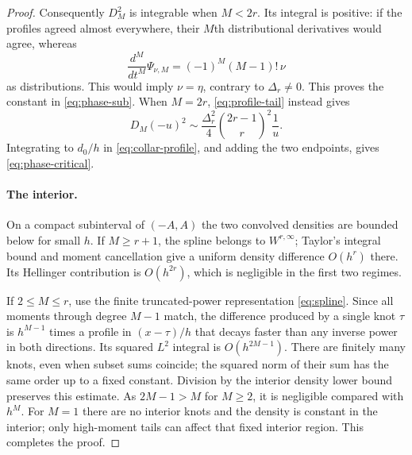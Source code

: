 \documentclass[11pt,a4paper]{article}
\numberwithin{equation}{section}
\theoremstyle{definition}
\theoremstyle{remark}
\begin{document}
\begin{proof}
Consequently $D_M^2$ is integrable when $M<2r$. Its integral is positive:
if the profiles agreed almost everywhere, their $M$th distributional
derivatives would agree, whereas
\[
 \frac{d^M}{dt^M}\Psi_{\nu,M}
 =(-1)^M(M-1)!\,\nu
\]
as distributions. This would imply $\nu=\eta$, contrary to
$\Delta_r\ne0$. This proves the constant in \eqref{eq:phase-sub}.
When $M=2r$, \eqref{eq:profile-tail} instead gives
\[
 D_M(-u)^2\sim\frac{\Delta_r^2}{4}
 \binom{2r-1}{r}^{\!2}\frac1u.
\]
Integrating to $d_0/h$ in \eqref{eq:collar-profile}, and adding the two
endpoints, gives \eqref{eq:phase-critical}.

\paragraph{The interior.}
On a compact subinterval of $(-A,A)$ the two convolved densities are bounded
below for small $h$. If $M\ge r+1$, the spline belongs to
$W^{r,\infty}$; Taylor's integral bound and moment cancellation give a
uniform density difference $O(h^r)$ there. Its Hellinger contribution is
$O(h^{2r})$, which is negligible in the first two regimes.

If $2\le M\le r$, use the finite truncated-power representation
\eqref{eq:spline}. Since all moments through degree $M-1$ match, the
difference produced by a single knot $\tau$ is $h^{M-1}$ times a profile
in $(x-\tau)/h$ that decays faster than any inverse power in both
directions. Its squared $L^2$ integral is $O(h^{2M-1})$.
There are finitely many knots, even when subset sums coincide; the squared
norm of their sum has the same order up to a fixed constant. Division by
the interior density lower bound preserves this estimate. As
$2M-1>M$ for $M\ge2$, it is negligible compared with $h^M$.
For $M=1$ there are no interior knots and the density is constant in the
interior; only high-moment tails can affect that fixed interior region.
This completes the proof.
\end{proof}
\end{document}
